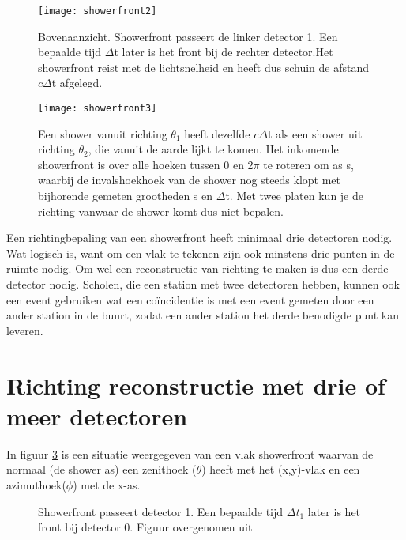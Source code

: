 \begin{figure}
    \centering
    \texttt{[image: showerfront2]}
    \caption{Bovenaanzicht. Showerfront passeert de linker detector 1. Een bepaalde tijd $\Delta$t later is het front bij de rechter detector.Het showerfront reist met de lichtsnelheid en heeft dus schuin de afstand $c\Delta$t afgelegd.}
   \label{fig:showerfront2}
\end{figure}

\begin{figure}
    \centering
    \texttt{[image: showerfront3]}
    \caption{Een shower vanuit richting $\theta_{1}$ heeft dezelfde $c\Delta$t als een shower uit richting  $\theta_{2}$, die vanuit de aarde lijkt te komen.
 Het inkomende showerfront is over alle hoeken tussen 0 en 2$\pi$ te roteren om as s, waarbij de invalshoekhoek van de shower nog steeds klopt met bijhorende gemeten grootheden s en  $\Delta$t.  Met twee platen kun je de richting vanwaar de shower komt dus niet bepalen. }
   \label{fig:showerfront3}
\end{figure}

Een richtingbepaling van een showerfront heeft minimaal drie detectoren nodig. Wat logisch is, want om een vlak te tekenen zijn ook minstens drie punten in de ruimte nodig.
Om wel een reconstructie van richting te maken is dus een derde detector nodig. Scholen, die een station met twee detectoren hebben, kunnen ook een event gebruiken wat een coïncidentie is met een event gemeten door een ander station in de buurt, zodat een ander station het derde benodigde punt kan leveren. 

\section{Richting reconstructie met drie of meer detectoren}


In figuur \ref{fig:frontthesis} is een situatie weergegeven van een vlak showerfront waarvan de normaal (de shower as) een zenithoek ($\theta$) heeft met het (x,y)-vlak en een azimuthoek($\phi$) met de x-as.

\begin{figure}
    \centering
    
  
    \caption{Showerfront passeert detector 1. Een bepaalde tijd $\Delta t_1$ later is het front bij detector 0.  Figuur overgenomen uit  \cite{Fokkema}}
  \label{fig:frontthesis}
\end{figure}

